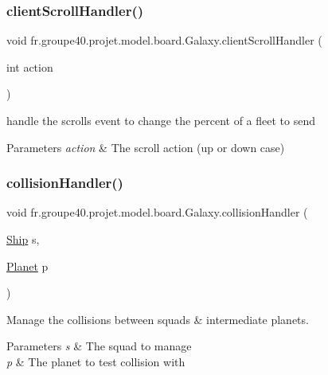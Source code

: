 \subsubsection{\texorpdfstring{client\+Scroll\+Handler()}{clientScrollHandler()}}
{\footnotesize\ttfamily void fr.\+groupe40.\+projet.\+model.\+board.\+Galaxy.\+client\+Scroll\+Handler (\begin{DoxyParamCaption}\item[{int}]{action }\end{DoxyParamCaption})}



handle the scrolls event to change the percent of a fleet to send 


\begin{DoxyParams}{Parameters}
{\em action} & The scroll action (up or down case) \\
\hline
\end{DoxyParams}
\mbox{\label{classfr_1_1groupe40_1_1projet_1_1model_1_1board_1_1_galaxy_a707f976a47503d6afab529da6a36a148}} 
\subsubsection{\texorpdfstring{collision\+Handler()}{collisionHandler()}}
{\footnotesize\ttfamily void fr.\+groupe40.\+projet.\+model.\+board.\+Galaxy.\+collision\+Handler (\begin{DoxyParamCaption}\item[{\mbox{\hyperlink{classfr_1_1groupe40_1_1projet_1_1model_1_1ships_1_1_ship}{Ship}}}]{s,  }\item[{\mbox{\hyperlink{classfr_1_1groupe40_1_1projet_1_1model_1_1planets_1_1_planet}{Planet}}}]{p }\end{DoxyParamCaption})}



Manage the collisions between squads \& intermediate planets. 


\begin{DoxyParams}{Parameters}
{\em s} & The squad to manage \\
\hline
{\em p} & The planet to test collision with \\
\hline
\end{DoxyParams}
\mbox{\label{classfr_1_1groupe40_1_1projet_1_1model_1_1board_1_1_galaxy_adc4718307d1288fe07acabd1f31415c9}} 

